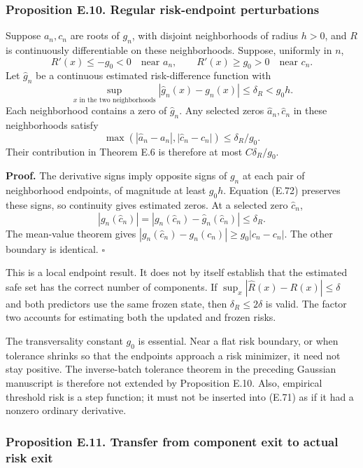 \subsubsection{Proposition E.10. Regular risk-endpoint
perturbations}\label{risk_boundaries-proposition-e.10.-regular-risk-endpoint-perturbations}

Suppose \(a_n,c_n\) are roots of \(g_n\), with disjoint neighborhoods of
radius \(h>0\), and \(R\) is continuously differentiable on these
neighborhoods. Suppose, uniformly in \(n\), \[
R'(x)\le-g_0<0\quad\text{near }a_n,\qquad
R'(x)\ge g_0>0\quad\text{near }c_n.
\tag{E.71}
\] Let \(\widehat g_n\) be a continuous estimated risk-difference
function with \[
\sup_{x\text{ in the two neighborhoods}}
|\widehat g_n(x)-g_n(x)|\le\delta_R<g_0h.
\tag{E.72}
\] Each neighborhood contains a zero of \(\widehat g_n\). Any selected
zeros \(\widehat a_n,\widehat c_n\) in these neighborhoods satisfy \[
\max(|\widehat a_n-a_n|,|\widehat c_n-c_n|)
\le\delta_R/g_0.
\tag{E.73}
\] Their contribution in Theorem E.6 is therefore at most
\(C\delta_R/g_0\).

\textbf{Proof.} The derivative signs imply opposite signs of \(g_n\) at
each pair of neighborhood endpoints, of magnitude at least \(g_0h\).
Equation (E.72) preserves these signs, so continuity gives estimated
zeros. At a selected zero \(\widehat c_n\), \[
|g_n(\widehat c_n)|
=|g_n(\widehat c_n)-\widehat g_n(\widehat c_n)|
\le\delta_R.
\] The mean-value theorem gives
\(|g_n(\widehat c_n)-g_n(c_n)|\ge g_0|\widehat c_n-c_n|\). The other
boundary is identical. \(\square\)

This is a local endpoint result. It does not by itself establish that
the estimated safe set has the correct number of components. If
\(\sup_x|\widehat R(x)-R(x)|\le\delta\) and both predictors use the same
frozen state, then \(\delta_R\le2\delta\) is valid. The factor two
accounts for estimating both the updated and frozen risks.

The transversality constant \(g_0\) is essential. Near a flat risk
boundary, or when tolerance shrinks so that the endpoints approach a
risk minimizer, it need not stay positive. The inverse-batch tolerance
theorem in the preceding Gaussian manuscript is therefore not extended
by Proposition E.10. Also, empirical threshold risk is a step function;
it must not be inserted into (E.71) as if it had a nonzero ordinary
derivative.

\subsubsection{Proposition E.11. Transfer from component exit to actual
risk
exit}\label{risk_boundaries-proposition-e.11.-transfer-from-component-exit-to-actual-risk-exit}

